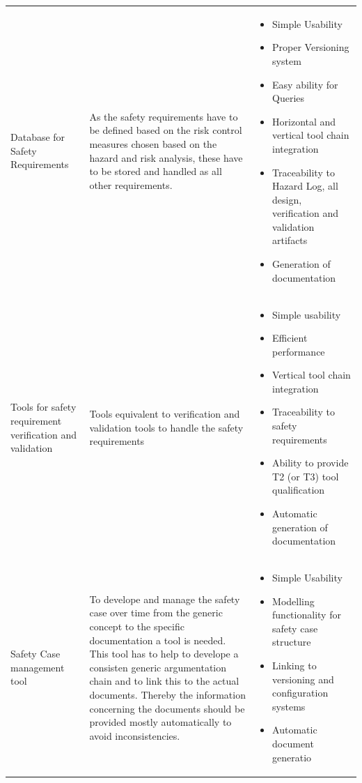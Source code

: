 \documentclass{template/openetcs_article}
\begin{document}
\begin{longtable}[htbp]{p{4cm}|p{5cm}|p{5cm}}
     Database for Safety Requirements & As the safety requirements have to be defined based on the risk control measures chosen based on the hazard and risk analysis, these have to be stored and handled as all other requirements. & \begin{itemize}
                   \item Simple Usability
                   \item Proper Versioning system 
                   \item Easy ability for Queries
                   \item Horizontal and vertical tool chain integration
                   \item Traceability to Hazard Log, all design, verification and validation artifacts
                   \item Generation of documentation
                       \end{itemize} \\  
     Tools for safety requirement verification and validation & Tools equivalent to verification and validation tools to handle the safety requirements & \begin{itemize}
                        \item Simple usability
                        \item Efficient performance
                        \item Vertical tool chain integration
                        \item Traceability to safety requirements
                        \item Ability to provide T2 (or T3) tool qualification 
                        \item Automatic generation of documentation
                            \end{itemize}\\
     Safety Case management tool & To develope and manage the safety case over time from the generic concept to the specific documentation a tool is needed. This tool has to help to develope a consisten generic argumentation chain and to link this to the actual documents. Thereby the information concerning the documents should be provided mostly automatically to avoid inconsistencies. & \begin{itemize}
                   \item Simple Usability
                   \item Modelling  functionality for safety case structure
                   \item Linking to versioning and configuration systems
                   \item Automatic document generatio
                       \end{itemize}   \\ 
    \end{longtable}%
 
\end{document}
